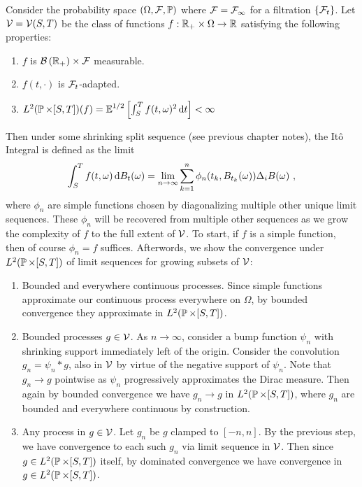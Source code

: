 \documentclass{article}
\begin{document}
\begin{definition}[It\^{o} Integral]
  Consider the probability space \((\Omega,\mcF,\P)\) where \(\mcF=\mcF_\infty\) for a filtration \(\ca{\mcF_t}\). Let \(\mcV =\mcV(S, T)\) be the class of functions \(f: \R_+\times \Omega\rightarrow\R\) satisfying the following properties:
  \begin{enumerate}
  \item \(f\) is \(\mathcal{B}\pa{\R_+}\times\mcF\) measurable.
  \item \(f(t, \cdot)\) is \(\mcF_t\)-adapted.
  \item \(L^2(\P \times [S,T])(f)=\E^{1/2}\ha{\int_S^T f(t,\omega)^2\d{t}}<\infty\)
  \end{enumerate}

  Then under some shrinking split sequence (see previous chapter notes), the It\^{o} Integral is defined as the limit
  \[
\int_S^Tf(t, \omega)\d{B_t(\omega)}=\lim_{n\rightarrow\infty}\sum_{k=1}^n\phi_n(t_k, B_{t_k}(\omega))\Delta_i B(\omega)\,\,,
\]
where \(\phi_n\) are simple functions chosen by diagonalizing multiple other unique limit sequences. These \(\phi_n\) will be recovered from multiple other sequences as we grow the complexity of \(f\) to the full extent of \(\mcV\). To start, if \(f\) is a simple function, then of course \(\phi_n=f\) suffices. Afterwords, we show the convergence under \(L^2(\P \times [S, T])\) of limit sequences for growing subsets of $\mcV$:
\begin{enumerate}
\item Bounded and everywhere continuous processes. Since simple functions approximate our continuous process everywhere on \(\Omega\), by bounded convergence they approximate in \(L^2(\P \times [S, T])\).
\item Bounded processes \(g\in \mcV\). As \(n\rightarrow\infty\), consider a bump function \(\psi_n\) with shrinking support immediately left of the origin. Consider the convolution \(g_n=\psi_n * g\), also in \(\mcV\) by virtue of the negative support of \(\psi_n\). Note that \(g_n\rightarrow g\) pointwise as \(\psi_n\) progressively approximates the Dirac measure. Then again by bounded convergence we have \(g_n\rightarrow g\) in \(L^2(\P \times [S, T])\), where \(g_n\) are bounded and everywhere continuous by construction.
\item Any process in \(g\in \mcV\). Let \(g_n\) be \(g\) clamped to \([-n, n]\). By the previous step, we have convergence to each such \(g_n\) via limit sequence in \(\mcV\). Then since \(g\in L^2(\P \times [S,T])\) itself, by dominated convergence we have convergence in \(g\in L^2(\P \times [S,T])\).
\end{enumerate} 
\end{definition}
\end{document}
